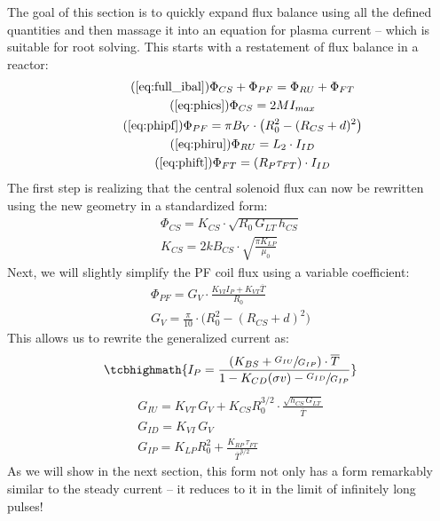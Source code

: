 The goal of this section is to quickly expand flux balance using all the defined quantities and then massage it into an equation for plasma current -- which is suitable for root solving. This starts with a restatement of flux balance in a reactor:
\begin{gather}
	\tag{\ref{eq:full_ibal}}
	\Phi_{CS} + \Phi_{PF} = \Phi_{RU} + \Phi_{FT} \\
	\tag{\ref{eq:phics}}
	\Phi_{CS} = 2 M I_{max} \\
	\tag{\ref{eq:phipf}}
	\Phi_{PF} = \pi B_V \cdot \left( R_0^2 - ( R_{CS} + d ) ^ 2 \right) \\
	\tag{\ref{eq:phiru}}
	\Phi_{RU} = L_2 \cdot I_{ID} \\
	\tag{\ref{eq:phift}}
	\Phi_{FT} = ( R_P \tau_{FT} ) \cdot I_{ID}
\end{gather}
The first step is realizing that the central solenoid flux can now be rewritten using the new geometry in a standardized form:
\begin{gather}
	\Phi_{CS} = K_{CS} \cdot \sqrt{ R_0 \, G_{LT} \, h_{CS} } \\
	K_{CS} = 2 k B_{CS} \cdot \sqrt{ \frac{ \pi K_{LP} }{ \mu_0 } }
\end{gather}
Next, we will slightly simplify the PF coil flux using a  variable coefficient:
\begin{gather}
	\Phi_{PF} = G_V \cdot \frac{ K_{VI} I_P + K_{VT} \overline T }{R_0} \\
	G_V = \frac{ \pi }{ 10 } \cdot \big( R_0^2 - \left( R_{CS} + d \right) ^2 \big)
\end{gather}
This allows us to rewrite the generalized current as:
\begin{equation}
	\label{eq:gen_ip}
	\tcbhighmath{
	I_P = \frac{ \left( K_{BS} + \sfrac{ G_{IU} }{ G_{IP} } \right) \cdot \overline T }{ 1 - K_{CD} ( \sigma v ) - \sfrac{ G_{ID} }{ G_{IP} } }
	}
\end{equation}
\begin{gather}
	G_{IU} = K_{VT} \, G_V + K_{CS} R_0^{3/2} \cdot \frac{ \sqrt{ h_{CS} \, G_{LT} } }{ \overline T } \\
	G_{ID} = K_{VI} \, G_V \\
	\label{eq:gip}
	G_{IP} = K_{LP} R_0^2 + \frac{ K_{RP} \, \tau_{FT} }{ \overline T ^ {3/2} }
\end{gather}
As we will show in the next section, this form not only has a form remarkably similar to the steady current -- it reduces to it in the limit of infinitely long pulses!

